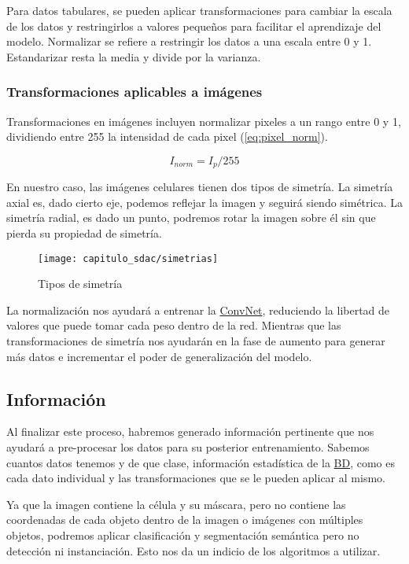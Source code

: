 Para datos tabulares, se pueden aplicar transformaciones para cambiar la escala
de los datos y restringirlos a valores pequeños para facilitar el aprendizaje
del modelo. Normalizar se refiere a restringir los datos a una escala entre 0 y
1. Estandarizar resta la media y divide por la varianza.

\subsubsection{Transformaciones aplicables a imágenes}

Transformaciones en imágenes incluyen normalizar pixeles a un rango entre 0 y 1, dividiendo
entre 255 la intensidad de cada pixel (\autoref{eq:pixel_norm}).

\begin{equation}
    \label{eq:pixel_norm}
    I_{norm} = I_{p} / 255
\end{equation}

En nuestro caso, las imágenes celulares tienen dos tipos de simetría. La
simetría axial es, dado cierto eje, podemos reflejar la imagen y seguirá siendo
simétrica. La simetría radial, es dado un punto, podremos rotar la imagen sobre
él sin que pierda su propiedad de simetría.

\begin{figure}[H]
    \centering
    \texttt{[image: capitulo\_sdac/simetrias]}
    \caption{Tipos de simetría}\label{fig:simetrias}
\end{figure}

La normalización nos ayudará a entrenar la \hyperlink{abbr}{ConvNet}, reduciendo la libertad de
valores que puede tomar cada peso dentro de la red. Mientras que las
transformaciones de simetría nos ayudarán en la fase de aumento para generar más
datos e incrementar el poder de generalización del modelo.

\subsection{Información}

Al finalizar este proceso, habremos generado información pertinente que nos
ayudará a pre-procesar los datos para su posterior entrenamiento. Sabemos
cuantos datos tenemos y de que clase, información estadística de la \hyperlink{abbr}{BD}, como
es cada dato individual y las transformaciones que se le pueden aplicar al mismo.

Ya que la imagen contiene la célula y su máscara, pero no contiene las
coordenadas de cada objeto dentro de la imagen o imágenes con múltiples objetos,
podremos aplicar clasificación y segmentación semántica pero no detección ni
instanciación. Esto nos da un indicio de los algoritmos a utilizar.

